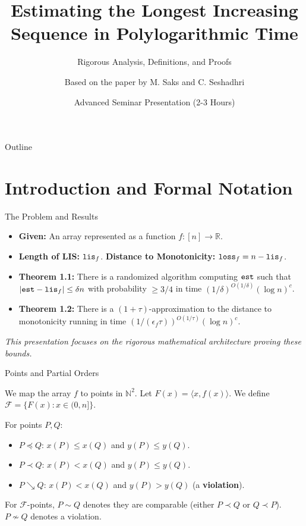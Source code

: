 \documentclass[11pt,aspectratio=169]{beamer}
\title[Estimating LIS in Polylog Time: Advanced Theory]{Estimating the Longest Increasing Sequence in Polylogarithmic Time}
\subtitle{Rigorous Analysis, Definitions, and Proofs}
\author{Based on the paper by M. Saks and C. Seshadhri}
\date{Advanced Seminar Presentation (2-3 Hours)}
\newcommand{\lis}{{\tt lis}}
\newcommand{\loss}{{\tt loss}}
\newcommand{\est}{{\tt est}}
\begin{document}
\begin{frame}
    \titlepage
\end{frame}

\begin{frame}{Outline}
    \tableofcontents[hideallsubsections]
\end{frame}

\section{Introduction and Formal Notation}

\begin{frame}{The Problem and Results}
    \begin{itemize}
        \item \textbf{Given:} An array represented as a function $f:[n] \rightarrow \mathbb{R}$.
        \item \textbf{Length of LIS:} $\lis_f$. \textbf{Distance to Monotonicity:} $\loss_f = n - \lis_f$.
        \item \textbf{Theorem 1.1:} There is a randomized algorithm computing $\est$ such that $|\est - \lis_f| \leq \delta n$ with probability $\geq 3/4$ in time $(1/\delta)^{O(1/\delta)} (\log n)^c$.
        \item \textbf{Theorem 1.2:} There is a $(1+\tau)$-approximation to the distance to monotonicity running in time $(1/(\epsilon_f\tau))^{O(1/\tau)}(\log n)^c$.
    \end{itemize}
    \vspace{0.5cm}
    \textit{This presentation focuses on the rigorous mathematical architecture proving these bounds.}
\end{frame}

\begin{frame}{Points and Partial Orders}
    \begin{definition}
        We map the array $f$ to points in $\mathbb{N}^2$. Let $F(x) = \langle x, f(x) \rangle$. We define $\mathcal{F} = \{F(x) : x \in (0, n]\}$.
    \end{definition}
    
    \begin{definition}
        For points $P, Q$:
        \begin{itemize}
            \item $P \preceq Q$: $x(P) \leq x(Q)$ and $y(P) \leq y(Q)$.
            \item $P \prec Q$: $x(P) < x(Q)$ and $y(P) \leq y(Q)$.
            \item $P \searrow Q$: $x(P) < x(Q)$ and $y(P) > y(Q)$ (a \textbf{violation}).
        \end{itemize}
        For $\mathcal{F}$-points, $P \sim Q$ denotes they are comparable (either $P \prec Q$ or $Q \prec P$). $P \not\sim Q$ denotes a violation.
    \end{definition}
\end{frame}
\end{document}
